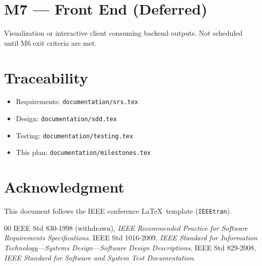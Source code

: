 \documentclass[conference]{IEEEtran}
\begin{document}
\section{M7 --- Front End (Deferred)}
Visualization or interactive client consuming backend outputs. Not scheduled
until M6 exit criteria are met.

\section{Traceability}
\begin{itemize}
  \item Requirements: \texttt{documentation/srs.tex}
  \item Design: \texttt{documentation/sdd.tex}
  \item Testing: \texttt{documentation/testing.tex}
  \item This plan: \texttt{documentation/milestones.tex}
\end{itemize}

\section*{Acknowledgment}
This document follows the IEEE conference \LaTeX\ template (\texttt{IEEEtran}).

\begin{thebibliography}{00}
 IEEE Std 830-1998 (withdrawn), \emph{IEEE Recommended Practice
for Software Requirements Specifications}.
 IEEE Std 1016-2009, \emph{IEEE Standard for Information
Technology---Systems Design---Software Design Descriptions}.
 IEEE Std 829-2008, \emph{IEEE Standard for Software and
System Test Documentation}.
\end{thebibliography}
\end{document}

